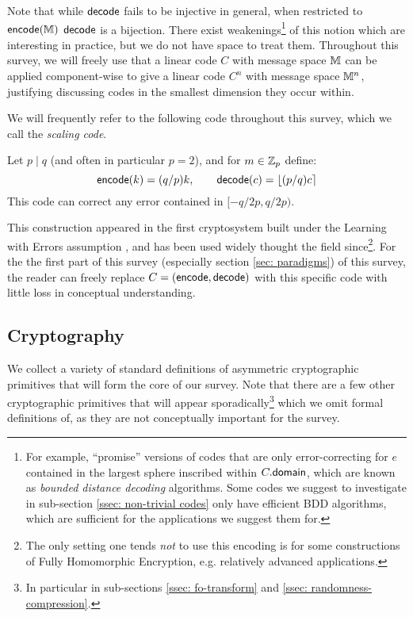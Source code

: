 Note that while $\mathsf{decode}$ fails to be injective in general, when restricted to $\mathsf{encode}(\mathbb{M})$ $\mathsf{decode}$ is a bijection.
There exist weakenings\footnote{For example, ``promise'' versions of codes that are only error-correcting for $e$ contained in the largest sphere inscribed within $C.\mathsf{domain}$, which are known as \emph{bounded distance decoding} algorithms.
Some codes we suggest to investigate in sub-section \ref{ssec: non-trivial codes} only have efficient BDD algorithms, which are sufficient for the applications we suggest them for.} of this notion which are interesting in practice, but we do not have space to treat them.
Throughout this survey, we will freely use that a linear code $C$ with message space $\mathbb{M}$ can be applied component-wise to give a linear code $C^n$ with message space $\mathbb{M}^n$, justifying discussing codes in the smallest dimension they occur within.

We will frequently refer to the following code throughout this survey, which we call the \emph{scaling code}.
\begin{example}\label{ex: scaling}
	Let $p\mid q$ (and often in particular $p = 2$), and for $m\in\mathbb{Z}_p$ define:
	\begin{equation*}
	\mathsf{encode}(k) = (q/p)k,\qquad \mathsf{decode}(c) = \lfloor (p/q)c\rceil
	\end{equation*}
	This code can correct any error contained in $[-q/2p, q/2p)$.
\end{example}
This construction appeared in the first cryptosystem built under the Learning with Errors assumption \cite{STOC:Regev05}, and has been used widely thought the field since\footnote{The only setting one tends \emph{not} to use this encoding is for some constructions of Fully Homomorphic Encryption, e.g. relatively advanced applications.}.
For the the first part of this survey (especially section \ref{sec: paradigms}) of this survey, the reader can freely replace $C = (\mathsf{encode}, \mathsf{decode})$ with this specific code with little loss in conceptual understanding.

\subsection{Cryptography}
We collect a variety of standard definitions of asymmetric cryptographic primitives that will form the core of our survey.
Note that there are a few other cryptographic primitives that will appear sporadically\footnote{In particular in sub-sections \ref{ssec: fo-transform} and \ref{ssec: randomness-compression}.} which we omit formal definitions of, as they are not conceptually important for the survey.


